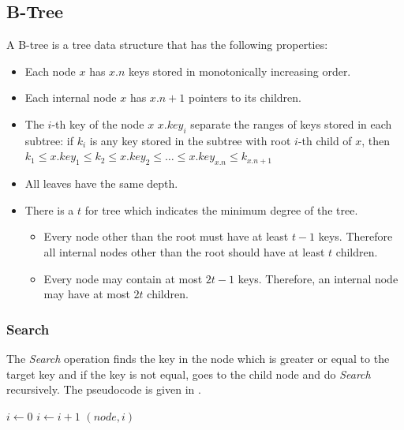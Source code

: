 \documentclass[sigconf]{acmart}
\begin{document}
\subsection{B-Tree}
\label{sec:btree}
A B-tree is a tree data structure that has the following properties\cite{Cormen_Leiserson_Rivest_Stein_2022}:
\begin{itemize}[noitemsep, topsep=0pt, parsep=0pt, partopsep=0pt]
    \item Each node $x$ has $x.n$ keys stored in monotonically increasing order.
    \item Each internal node $x$ has $x.n + 1$ pointers to its children.
    \item The $i$-th key of the node $x$ $x.key_{i}$ separate the ranges of keys stored in each subtree: if $k_{i}$ is any key stored in the subtree with root $i$-th child of $x$, 
    then $k_{1} \le x.key_{1} \le k_{2} \le x.key_{2} \le \dots \le x.key_{x.n} \le k_{x.n+1}$
    \item All leaves have the same depth.
    \item There is a $t$ for tree which indicates the minimum degree of the tree.
    \begin{itemize}[noitemsep, topsep=0pt, parsep=0pt, partopsep=0pt]
      \item Every node other than the root must have at least $t - 1$ keys. Therefore all internal nodes other than the root should have at least $t$ children.
      \item Every node may contain at most $2t - 1$ keys. Therefore, an internal node may have at most $2t$ children.
    \end{itemize}
\end{itemize}

\subsubsection{Search}
The \textit{Search} operation finds the key in the node which is greater or equal to the target key and if the key is not equal, goes to the child node and do \textit{Search} recursively. The pseudocode is given in .

\begin{algorithm}[tbp]
\caption{B-Tree Search Algorithm}
\label{alg:btree-search}
\begin{algorithmic}[1]
    \State $i \gets 0$
        \State $i \gets i + 1$
    \EndWhile
        \State \Return $(node, i)$
    \EndIf
        \State \Return {}
    \EndIf
    \State \Return {}
\EndProcedure
\end{algorithmic}
\end{algorithm}
\end{document}
